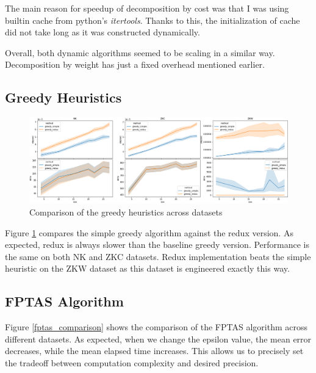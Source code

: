 \documentclass[a4paper,10pt]{article}
\begin{document}
The main reason for speedup of decomposition by cost was that I was using builtin cache from python's \emph{itertools}. Thanks to this, the initialization of cache did not take long as it was constructed dynamically.

Overall, both dynamic algorithms seemed to be scaling in a similar way.  Decomposition by weight has just a fixed overhead mentioned earlier.

\subsection{Greedy Heuristics}

\begin{figure}[!htb]
	\centering
  	\includegraphics[width=\textwidth]{images/greedy_comparison_datasets.png}
	\caption{Comparison of the greedy heuristics across datasets}
	\label{greedy_comparison_datasets}
\end{figure}

Figure \ref{greedy_comparison_datasets} compares the simple greedy algorithm against the redux version. As expected, redux is always slower than the baseline greedy version. Performance is the same on both NK and ZKC datasets. Redux implementation beats the simple heuristic on the ZKW dataset as this dataset is engineered exactly this way.

\subsection{FPTAS Algorithm}


Figure \ref{fptas_comparison} shows the comparison of the FPTAS algorithm across different datasets. As expected, when we change the epsilon value, the mean error decreases, while the mean elapsed time increases. This allows us to precisely set the tradeoff between computation complexity and desired precision.
\end{document}
